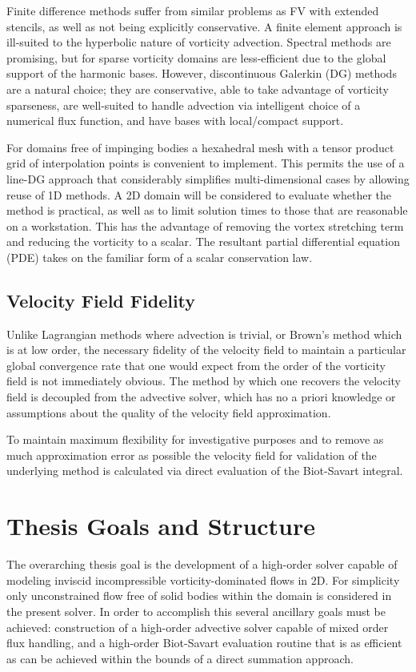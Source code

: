 \documentclass[letterpaper,12pt]{report}
\begin{document}
Finite difference methods suffer from similar problems as FV with extended stencils, as well as not being explicitly conservative. A finite element approach is ill-suited to the hyperbolic nature of vorticity advection. Spectral methods are promising, but for sparse vorticity domains are less-efficient due to the global support of the harmonic bases. However, discontinuous Galerkin (DG) methods \cite{HestWar} are a natural choice; they are conservative, able to take advantage of vorticity sparseness, are well-suited to handle advection via intelligent choice of a numerical flux function, and have bases with local/compact support.

For domains free of impinging bodies a hexahedral mesh with a tensor product grid of interpolation points is convenient to implement. This permits the use of a line-DG \cite{Persson2013} approach that considerably simplifies multi-dimensional cases by allowing reuse of 1D methods. A 2D domain will be considered to evaluate whether the method is practical, as well as to limit solution times to those that are reasonable on a workstation. This has the advantage of removing the vortex stretching term and reducing the vorticity to a scalar. The resultant partial differential equation (PDE) takes on the familiar form of a scalar conservation law.

\subsection{Velocity Field Fidelity}
Unlike Lagrangian methods where advection is trivial, or Brown's method \cite{Brown2004} which is at low order, the necessary fidelity of the velocity field to maintain a particular global convergence rate that one would expect from the order of the vorticity field is not immediately obvious. The method by which one recovers the velocity field is decoupled from the advective solver, which has no a priori knowledge or assumptions about the quality of the velocity field approximation. 

To maintain maximum flexibility for investigative purposes and to remove as much approximation error as possible the velocity field for validation of the underlying method is calculated via direct evaluation of the Biot-Savart integral.

\section{Thesis Goals and Structure}
The overarching thesis goal is the development of a high-order solver capable of modeling inviscid incompressible vorticity-dominated flows in 2D. For simplicity only unconstrained flow free of solid bodies within the domain is considered in the present solver. In order to accomplish this several ancillary goals must be achieved: construction of a high-order advective solver capable of mixed order flux handling, and a high-order Biot-Savart evaluation routine that is as efficient as can be achieved within the bounds of a direct summation approach.
\end{document}
